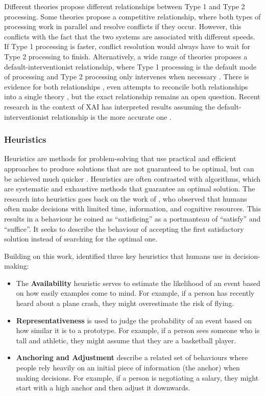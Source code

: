 Different theories propose different relationships between Type 1 and Type 2 processing. Some theories propose a competitive relationship, where both types of processing work in parallel and resolve conflicts if they occur. However, this conflicts with the fact that the two systems are associated with different speeds. If Type 1 processing is faster, conflict resolution would always have to wait for Type 2 processing to finish. Alternatively, a wide range of theories proposes a default-interventionist relationship, where Type 1 processing is the default mode of processing and Type 2 processing only intervenes when necessary \parencite{Evans2013}. There is evidence for both relationships \parencite{Evans2013}, even attempts to reconcile both relationships into a single theory \parencite{Djulbegovic2012}, but the exact relationship remains an open question. Recent research in the context of \ac{XAI} has interpreted results assuming the default-interventionist relationship is the more accurate one \parencite{Jussupow2021, Shin2021}.

\subsubsection{Heuristics} \label{sssec:heuristics}

Heuristics are methods for problem-solving that use practical and efficient approaches to produce solutions that are not guaranteed to be optimal, but can be achieved much quicker \parencite{Gigerenzer2011}. Heuristics are often contrasted with algorithms, which are systematic and exhaustive methods that guarantee an optimal solution. The research into heuristics goes back on the work of \cite{Simon1955}, who observed that humans often make decisions with limited time, information, and cognitive resources. This results in a behaviour he coined as “satisficing” \parencite{Simon1956} as a portmanteau of “satisfy” and “suffice”. It seeks to describe the behaviour of accepting the first satisfactory solution instead of searching for the optimal one.

Building on this work, \textcite{Tversky1974} identified three key heuristics that humans use in decision-making:

\begin{itemize}
    \item The \textbf{Availability} heuristic serves to estimate the likelihood of an event based on how easily examples come to mind. For example, if a person has recently heard about a plane crash, they might overestimate the risk of flying.
    \item \textbf{Representativeness} is used to judge the probability of an event based on how similar it is to a prototype. For example, if a person sees someone who is tall and athletic, they might assume that they are a basketball player.
    \item \textbf{Anchoring and Adjustment} describe a related set of behaviours where people rely heavily on an initial piece of information (the anchor) when making decisions. For example, if a person is negotiating a salary, they might start with a high anchor and then adjust it downwards.
\end{itemize}

